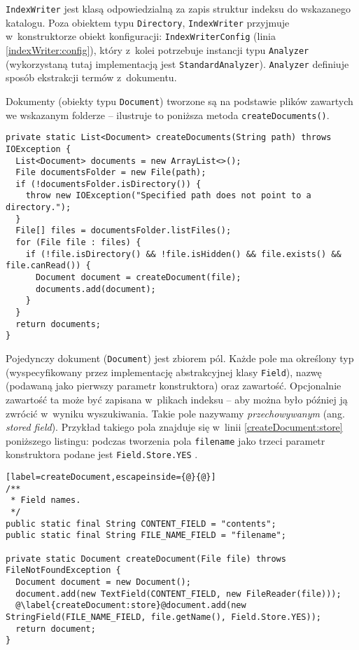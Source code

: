 \texttt{IndexWriter} jest klasą odpowiedzialną za zapis struktur indeksu do wskazanego katalogu. Poza obiektem typu \texttt{Directory}, \texttt{IndexWriter} przyjmuje w~konstruktorze obiekt konfiguracji: \texttt{IndexWriterConfig} (linia \ref{indexWriter:config}), który z~kolei potrzebuje instancji typu \texttt{Analyzer} (wykorzystaną tutaj implementacją jest \texttt{StandardAnalyzer}). \texttt{Analyzer} definiuje sposób ekstrakcji termów z~dokumentu.

Dokumenty (obiekty typu \texttt{Document}) tworzone są na podstawie plików zawartych we wskazanym folderze -- ilustruje to poniższa metoda \texttt{createDocuments()}.

\begin{lstlisting}
private static List<Document> createDocuments(String path) throws IOException {
  List<Document> documents = new ArrayList<>();
  File documentsFolder = new File(path);
  if (!documentsFolder.isDirectory()) {
    throw new IOException("Specified path does not point to a directory.");
  }
  File[] files = documentsFolder.listFiles();
  for (File file : files) {
    if (!file.isDirectory() && !file.isHidden() && file.exists() && file.canRead()) {
      Document document = createDocument(file);
      documents.add(document);
    }
  }
  return documents;
}
\end{lstlisting}

Pojedynczy dokument (\texttt{Document}) jest zbiorem pól. Każde pole ma określony typ (wyspecyfikowany przez implementację abstrakcyjnej klasy \texttt{Field}), nazwę (podawaną jako pierwszy parametr konstruktora) oraz zawartość. Opcjonalnie zawartość ta może być zapisana w~plikach indeksu -- aby można było później ją zwrócić w~wyniku wyszukiwania. Takie pole nazywamy \emph{przechowywanym} (ang. \emph{stored field}). Przykład takiego pola znajduje się w~linii \ref{createDocument:store} poniższego listingu: podczas tworzenia pola \texttt{filename} jako trzeci parametr konstruktora podane jest \texttt{Field.Store.YES} .

\begin{lstlisting}[label=createDocument,escapeinside={@}{@}]
/**
 * Field names.
 */
public static final String CONTENT_FIELD = "contents";
public static final String FILE_NAME_FIELD = "filename";

private static Document createDocument(File file) throws FileNotFoundException {
  Document document = new Document();
  document.add(new TextField(CONTENT_FIELD, new FileReader(file)));
  @\label{createDocument:store}@document.add(new StringField(FILE_NAME_FIELD, file.getName(), Field.Store.YES));
  return document;
}
\end{lstlisting}

